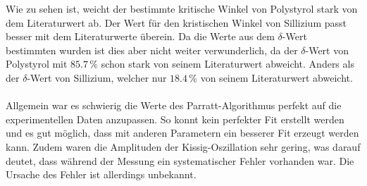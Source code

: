 Wie zu sehen ist, weicht der bestimmte kritische Winkel von Polystyrol stark von dem Literaturwert ab.
Der Wert für den kristischen Winkel von Sillizium passt besser mit dem Literaturwerte überein.
Da die Werte aus dem $\delta$-Wert bestimmten wurden ist dies aber nicht weiter verwunderlich, da der $\delta$-Wert von Polystyrol mit $85.7\,\%$ schon stark von seinem Literaturwert abweicht.
Anders als der $\delta$-Wert von Sillizium, welcher nur $18.4\,\%$ von seinem Literaturwert abweicht.
\\\\
Allgemein war es schwierig die Werte des Parratt-Algorithmus perfekt auf die experimentellen Daten anzupassen.
So konnt kein perfekter Fit erstellt werden und es gut möglich, dass mit anderen Parametern ein besserer Fit erzeugt werden kann.
Zudem waren die Amplituden der Kissig-Oszillation sehr gering, was darauf deutet, dass während der Messung ein systematischer Fehler vorhanden war.
Die Ursache des Fehler ist allerdings unbekannt.
